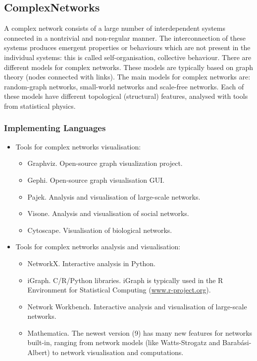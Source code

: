 \subsection{ComplexNetworks}
\author{Eva Navarro}
 A complex network consists of a large number of interdependent systems connected in a nontrivial
and non-regular manner. The interconnection of these systems produces emergent properties or behaviours which are not present in the individual systems: this is called self-organisation, collective behaviour. There are different models for complex networks. These models are typically based on graph theory (nodes connected with links). The main models for complex networks are:  random-graph networks, small-world networks and scale-free networks. Each of these models have different topological (structural) features, analysed with tools from statistical physics.

\subsubsection{Implementing Languages}

\begin{itemize}
\item Tools for complex networks visualisation:

\begin{itemize}
  \item  Graphviz. Open-source graph visualization project. 
	
	\item Gephi. Open-source graph visualisation GUI.
	
	\item Pajek. Analysis and visualisation of large-scale networks.

	 \item  Visone. Analysis and visualisation of social networks.

	\item Cytoscape. Visualisation of biological networks.

	\end{itemize}

\item Tools for complex networks analysis and visualisation:

\begin{itemize}
  \item  NetworkX. Interactive analysis in Python.
	
  \item iGraph. C/R/Python libraries. iGraph is typically used in the R Environment for Statistical Computing (\url{www.r-project.org}).
	
  \item Network Workbench. Interactive analysis and visualisation of large-scale networks.
  
  \item   Mathematica. The newest version (9) has many new features for networks built-in, ranging from network models (like Watts-Strogatz and Barab\'asi-Albert) to network visualisation and computations.
	\end{itemize}

\end{itemize}

